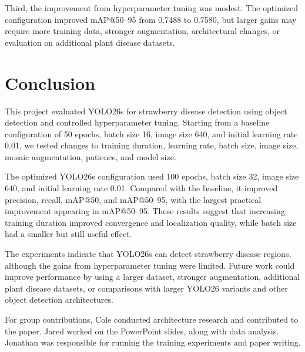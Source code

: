 \documentclass[10pt,twocolumn,letterpaper]{article}
\begin{document}
Third, the improvement from hyperparameter tuning was modest. The optimized configuration improved mAP@50--95 from 0.7488 to 0.7580, but larger gains may require more training data, stronger augmentation, architectural changes, or evaluation on additional plant disease datasets.

\section{Conclusion}
\label{sec:conclusion}

This project evaluated YOLO26s for strawberry disease detection using object detection and controlled hyperparameter tuning. Starting from a baseline configuration of 50 epochs, batch size 16, image size 640, and initial learning rate 0.01, we tested changes to training duration, learning rate, batch size, image size, mosaic augmentation, patience, and model size.

The optimized YOLO26s configuration used 100 epochs, batch size 32, image size 640, and initial learning rate 0.01. Compared with the baseline, it improved precision, recall, mAP@50, and mAP@50--95, with the largest practical improvement appearing in mAP@50--95. These results suggest that increasing training duration improved convergence and localization quality, while batch size had a smaller but still useful effect.

The experiments indicate that YOLO26s can detect strawberry disease regions, although the gains from hyperparameter tuning were limited. Future work could improve performance by using a larger dataset, stronger augmentation, additional plant disease datasets, or comparisons with larger YOLO26 variants and other object detection architectures.

For group contributions, Cole conducted architecture research and contributed to the paper. Jared worked on the PowerPoint slides, along with data analysis. Jonathan was responsible for running the training experiments and paper writing. 

{\small


}
\end{document}
